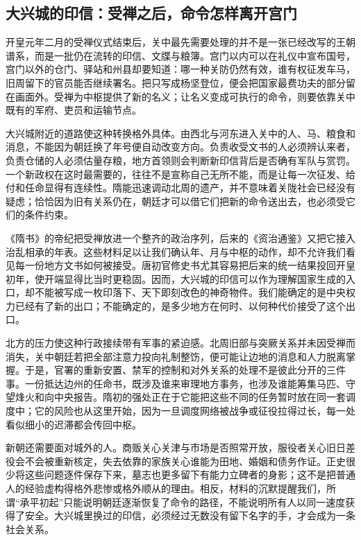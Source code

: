 \subsection{大兴城的印信：受禅之后，命令怎样离开宫门}
开皇元年二月的受禅仪式结束后，关中最先需要处理的并不是一张已经改写的王朝谱系，而是一批仍在流转的印信、文牒与粮簿。宫门以内可以在礼仪中宣布国号，宫门以外的仓门、驿站和州县却要知道：哪一种关防仍然有效，谁有权征发车马，旧周留下的官员能否继续署名。把只写成杨坚登位，便会把国家最费功夫的部分留在画面外。受禅为中枢提供了新的名义；让名义变成可执行的命令，则要依靠关中既有的军府、吏员和运输节点。

大兴城附近的道路使这种转换格外具体。由西北与河东进入关中的人、马、粮食和消息，不能因为朝廷换了年号便自动改变方向。负责收受文书的人必须辨认来者，负责仓储的人必须估量存粮，地方首领则会判断新印信背后是否确有军队与赏罚。一个新政权在这时最需要的，往往不是宣称自己无所不能，而是让每一次征发、给付和任命显得有连续性。隋能迅速调动北周的遗产，并不意味着关陇社会已经没有疑虑；恰恰因为旧有关系仍在，朝廷才可以借它们把新的命令送出去，也必须受它们的条件约束。

《隋书》的帝纪把受禅放进一个整齐的政治序列，后来的《资治通鉴》又把它接入治乱相承的年表。这些材料足以让我们确认年、月与中枢的动作，却不允许我们看见每一份地方文书如何被接受。唐初官修史书尤其容易把后来的统一结果投回开皇初年，使开端显得比当时更稳固。因而，大兴城的印信可以作为理解国家生成的入口，却不能被写成一枚印落下、天下即刻改色的神奇物件。我们能确定的是中央权力已经有了新的出口；不能确定的，是多少地方在何时、以何种代价接受了这个出口。

北方的压力使这种行政接续带有军事的紧迫感。北周旧部与突厥关系并未因受禅而消失，关中朝廷若把全部注意力投向礼制整饬，便可能让边地的消息和人力脱离掌握。于是，官署的重新安置、禁军的控制和对外关系的处理不是彼此分开的三件事。一份抵达边州的任命书，既涉及谁来审理地方事务，也涉及谁能筹集马匹、守望烽火和向中央报告。隋初的强处正在于它能把这些不同的任务暂时放在同一套调度中；它的风险也从这里开始，因为一旦调度网络被战争或征役拉得过长，每一处看似细小的迟滞都会传回中枢。

新朝还需要面对城外的人。商贩关心关津与市场是否照常开放，服役者关心旧日差役会不会被重新核定，失去依靠的家族关心谁能为田地、婚姻和债务作证。正史很少将这些问题逐件保存下来，墓志也更多留下有能力立碑者的身影；这不是把普通人的经验虚构得格外悲惨或格外顺从的理由。相反，材料的沉默提醒我们，所谓“承平初起”只能说明朝廷逐渐恢复了命令的路径，不能说明所有人以同一速度获得了安全。大兴城里换过的印信，必须经过无数没有留下名字的手，才会成为一条社会关系。

